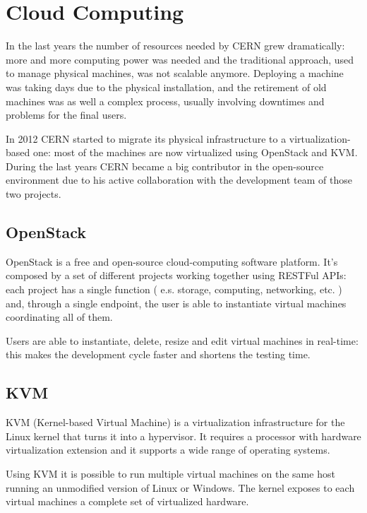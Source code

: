 \section{Cloud Computing}

In the last years the number of resources needed by CERN grew
dramatically: more and more computing power was needed and the traditional
approach, used to manage physical machines, was not scalable anymore.
Deploying a machine was taking days due to the physical installation, and
the retirement of old machines was as well a complex process, usually
involving downtimes and problems for the final users.

In 2012 CERN started to migrate its physical infrastructure to
a virtualization-based one: most of the machines are now virtualized using
OpenStack and KVM. During the last years CERN became a big contributor in
the open-source environment due to his active collaboration with the
development team of those two projects.

\subsection{OpenStack}

OpenStack is a free and open-source cloud-computing software platform.
It's composed by a set of different projects working together using
RESTFul APIs: each project has a single function ( e.s. storage,
computing, networking, etc. ) and, through a single endpoint, the user is
able to instantiate virtual machines coordinating all of them.

Users are able to instantiate, delete, resize and edit virtual machines in
real-time: this makes the development cycle faster and shortens the
testing time.

\subsection{KVM}

KVM (Kernel-based Virtual Machine) is a virtualization infrastructure for
the Linux kernel that turns it into a hypervisor. It requires a processor
with hardware virtualization extension and it supports a wide range of
operating systems.

Using KVM it is possible to run multiple virtual machines on the same host
running an unmodified version of Linux or Windows. The kernel exposes to
each virtual machines a complete set of virtualized hardware.
